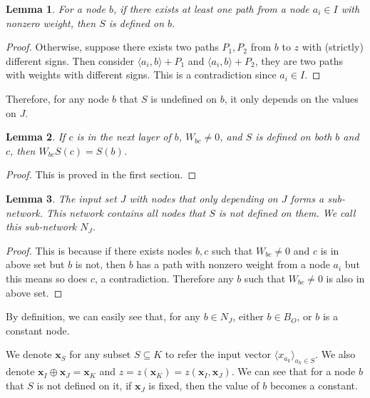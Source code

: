 \documentclass[]{article}
\newtheorem{lemma}{Lemma}
\theoremstyle{definition}
\begin{document}
\begin{lemma}\label{lem:sign}
	For a node $b$, if there exists at least one path from a node $a_i\in I$ with nonzero weight, then  $S$ is defined on $b$.
\end{lemma}

\begin{proof}
	Otherwise, suppose there exists two paths $P_1,P_2$ from $b$ to $z$ with (strictly) different signs. Then consider $\langle a_i,b\rangle+P_1$ and $\langle a_i,b\rangle+P_2$, they are two paths with weights with different signs. This is a contradiction since $a_i\in I$.
\end{proof}
Therefore, for any node $b$  that $S$ is undefined on $b$, it only depends on the values on $J$.  

\begin{lemma}
	If $c$ is in the next layer of $b$, $W_{bc}\neq 0$, and $S$ is defined on both $b$ and $c$, then $W_{bc}S(c)=S(b)$.
\end{lemma}

\begin{proof}
	This is proved in the first section.
\end{proof}

\begin{lemma}\label{lem:subnetwork2}
	The input set $J$ with nodes that only depending on $J$ forms a sub-network. This network contains all nodes that $S$ is not defined on them. We call this sub-network $N_J$.
\end{lemma}

\begin{proof}
	This is because if there exists nodes $b,c$ such that $W_{bc}\neq 0$ and $c$ is in above set but $b$ is not, then $b$ has a path with nonzero weight from a node $a_i$ but this means so does $c$, a contradiction. Therefore any $b$ such that $W_{bc}\neq 0$ is also in above set.
\end{proof}

By definition, we can easily see that, for any $b\in N_J$, either $b\in B_O$, or $b$ is a constant node.

We denote $\boldsymbol{x}_S$ for any subset $S\subseteq K$ to refer the input vector $\langle x_{a_k}\rangle_{a_k\in S}$. We also denote $\boldsymbol{x}_I\oplus \boldsymbol{x}_J = \boldsymbol{x}_K$ and $z=z(\boldsymbol{x}_K)=z(\boldsymbol{x}_I,\boldsymbol{x}_J)$. We can see that for a node $b$ that $S$ is not defined on it, if $\boldsymbol{x}_J$ is fixed, then the value of $b$ becomes a constant.
\end{document}

